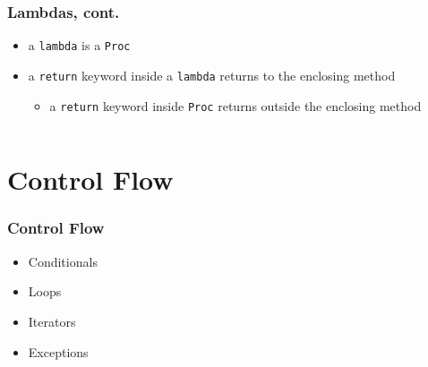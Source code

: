 \begin{frame}[fragile]\frametitle{Lambdas, cont.}

\begin{itemize}

\item a \texttt{lambda} is a \texttt{Proc}

\item a \texttt{return} keyword inside a \texttt{lambda} returns to the enclosing method
\begin{itemize}
\item a \texttt{return} keyword inside \texttt{Proc} returns outside the enclosing method
\end{itemize}

\end{itemize}

\pause

\begin{columns}[c] 

\begin{column}{5.5cm}

\end{column}

\pause

\begin{column}{5.5cm}

\end{column}

\end{columns}

\end{frame}






\section{Control Flow} 
\begin{frame}\frametitle{Control Flow} 
\begin{itemize}
\item Conditionals
\item Loops
\item Iterators
\item Exceptions
\end{itemize}
\end{frame}




